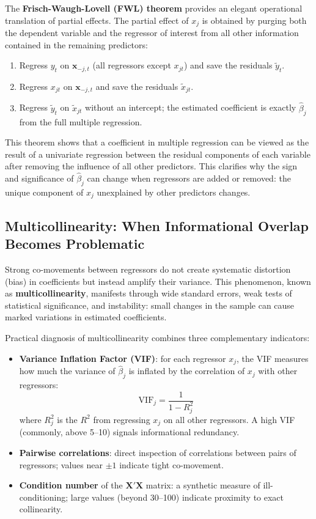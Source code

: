 The \textbf{Frisch-Waugh-Lovell (FWL) theorem} provides an elegant operational translation of partial effects. The partial effect of $x_j$ is obtained by purging both the dependent variable and the regressor of interest from all other information contained in the remaining predictors:
\begin{enumerate}
  \item Regress $y_t$ on $\mathbf{x}_{-j,t}$ (all regressors except $x_{jt}$) and save the residuals $\tilde{y}_t$.
  \item Regress $x_{jt}$ on $\mathbf{x}_{-j,t}$ and save the residuals $\tilde{x}_{jt}$.
  \item Regress $\tilde{y}_t$ on $\tilde{x}_{jt}$ without an intercept; the estimated coefficient is exactly $\hat{\beta}_j$ from the full multiple regression.
\end{enumerate}

This theorem shows that a coefficient in multiple regression can be viewed as the result of a univariate regression between the residual components of each variable after removing the influence of all other predictors. This clarifies why the sign and significance of $\hat{\beta}_j$ can change when regressors are added or removed: the unique component of $x_j$ unexplained by other predictors changes.
\subsection{Multicollinearity: When Informational Overlap Becomes Problematic}

Strong co-movements between regressors do not create systematic distortion (bias) in coefficients but instead amplify their variance. This phenomenon, known as \textbf{multicollinearity}, manifests through wide standard errors, weak tests of statistical significance, and instability: small changes in the sample can cause marked variations in estimated coefficients.

Practical diagnosis of multicollinearity combines three complementary indicators:
\begin{itemize}
  \item \textbf{Variance Inflation Factor (VIF)}: for each regressor $x_j$, the VIF measures how much the variance of $\hat{\beta}_j$ is inflated by the correlation of $x_j$ with other regressors:
  $$\text{VIF}_j = \frac{1}{1 - R_j^2}$$
  where $R_j^2$ is the $R^2$ from regressing $x_j$ on all other regressors. A high VIF (commonly, above 5--10) signals informational redundancy.
  \item \textbf{Pairwise correlations}: direct inspection of correlations between pairs of regressors; values near $\pm 1$ indicate tight co-movement.
  \item \textbf{Condition number} of the $\mathbf{X}'\mathbf{X}$ matrix: a synthetic measure of ill-conditioning; large values (beyond 30--100) indicate proximity to exact collinearity.
\end{itemize}
